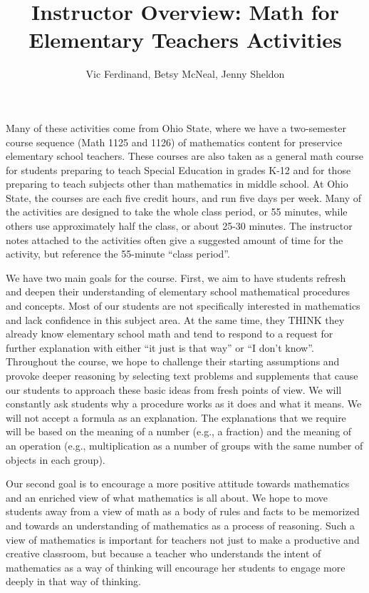 \documentclass{ximera}
\title{Instructor Overview: Math for Elementary Teachers Activities}
\author{Vic Ferdinand, Betsy McNeal, Jenny Sheldon}
\begin{document}
\begin{abstract}\end{abstract}\maketitle

Many of these activities come from Ohio State, where we have a two-semester course sequence 
(Math 1125 and 1126) of mathematics content for preservice elementary school teachers.  These 
courses are also taken as a general math course for students preparing 
to teach Special Education in grades K-12 and for those preparing to teach subjects other than 
mathematics in middle school.  At Ohio State, the courses are each five credit 
hours, and run five days per week.  Many of the activities are designed to take the whole class 
period, or 55 minutes, while others use approximately half the class, or about 25-30 minutes.  
The instructor notes attached to the activities often give a suggested amount of time for the 
activity, but reference the 55-minute ``class period''.

We have two main goals for the course.  First, we aim to have students refresh and deepen their 
understanding of elementary school mathematical procedures and concepts.  Most of our students 
are not specifically interested in mathematics and lack confidence in this subject area.  At the 
same time, they THINK they already know elementary school math and tend to respond to a request 
for further explanation with either ``it just is that way'' or ``I don't know''.  Throughout the 
course, we hope to challenge their starting assumptions and provoke deeper reasoning by selecting 
text problems and supplements that cause our students to approach these basic ideas from fresh 
points of view.  We will constantly ask students why a procedure works as it does and what it 
means.  We will not accept a formula as an explanation.  The explanations that we require will be 
based on the meaning of a number (e.g., a fraction) and the meaning of an operation (e.g., 
multiplication as a number of groups with the same number of objects in each group).  

Our second goal is to encourage a more positive attitude towards mathematics and an enriched view 
of what mathematics is all about.  We hope to move students away from a view of math as a body of 
rules and facts to be memorized and towards an understanding of mathematics as a process of 
reasoning. Such a view of mathematics is important for teachers not just to make a productive and 
creative classroom, but because a teacher who understands the intent of mathematics as a way of 
thinking will encourage her students to engage more deeply in that way of thinking.  
\end{document}
